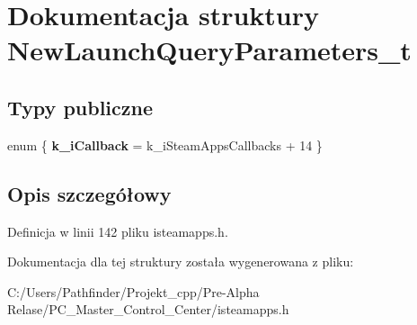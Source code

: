 \hypertarget{struct_new_launch_query_parameters__t}{}\section{Dokumentacja struktury New\+Launch\+Query\+Parameters\+\_\+t}
\label{struct_new_launch_query_parameters__t}
\subsection*{Typy publiczne}
\begin{DoxyCompactItemize}
\item 
\mbox{\label{struct_new_launch_query_parameters__t_affc1a98ad2b68f4947565fbe177e01b7}} 
enum \{ {\bfseries k\+\_\+i\+Callback} = k\+\_\+i\+Steam\+Apps\+Callbacks + 14
 \}
\end{DoxyCompactItemize}


\subsection{Opis szczegółowy}


Definicja w linii 142 pliku isteamapps.\+h.



Dokumentacja dla tej struktury została wygenerowana z pliku\+:\begin{DoxyCompactItemize}
\item 
C\+:/\+Users/\+Pathfinder/\+Projekt\+\_\+cpp/\+Pre-\/\+Alpha Relase/\+P\+C\+\_\+\+Master\+\_\+\+Control\+\_\+\+Center/isteamapps.\+h\end{DoxyCompactItemize}
